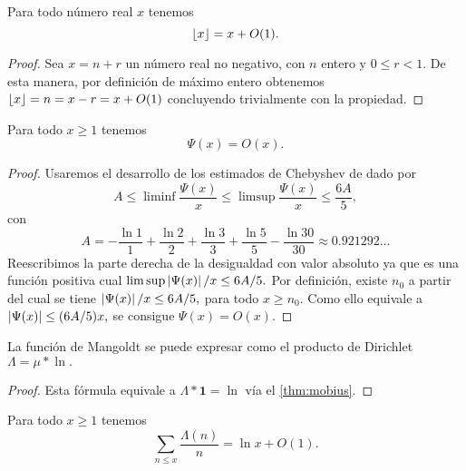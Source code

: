 \begin{lemma}
  \label{lem:floor-is-x-o1}
  Para todo n\'umero real \(x\) tenemos
  \[
    \left\lfloor x \right\rfloor = x + O(1).
  \]
\end{lemma}

\begin{proof}
  Sea \(x = n + r\) un n\'umero real no negativo, con
  \(n\) entero y \(0 \leq r < 1\).
  De esta manera, por definici\'on de m\'aximo entero obtenemos
  \(
    \left\lfloor x \right\rfloor = n = x - r = x + O(1)
  \)
  concluyendo trivialmente con la propiedad.
\end{proof}

\begin{lemma}
  \label{lem:psi-is-ox}
  Para todo \(x \geq 1\) tenemos
  \[
    \Psi(x) = O(x).
  \]
\end{lemma}

\begin{proof}
  Usaremos el desarrollo de los estimados de Chebyshev de \cite[secci\'on 3]{Diamond1982} dado por
  \[
    A \leq \liminf \frac{\Psi(x)}{x} \leq \limsup \frac{\Psi(x)}{x} \leq \frac{6A}{5},
  \]
  con
  \[
    A = -\frac{\ln 1}{1} + \frac{\ln 2}{2} + \frac{\ln 3}{3} + \frac{\ln 5}{5} - \frac{\ln 30}{30}
    \approx 0.921292...
  \]
  Reescribimos la parte derecha de la desigualdad con valor absoluto ya que es una funci\'on positiva cual
  \(
    \limsup \left\lvert \Psi(x) \right\rvert/x \leq 6A/5.
  \)
  Por definici\'on, existe \(n_0\) a partir del cual se tiene
  \(
    \left\lvert \Psi(x) \right\rvert/x \leq 6A/5,
  \)
  para todo \(x \geq n_0\).
  Como ello equivale a
  \(
    \left\lvert \Psi(x) \right\rvert \leq (6A/5) x,
  \)
  se consigue \(\Psi(x) = O(x)\).
\end{proof}

\begin{lemma}
  \label{lem:mangoldt-is-mu-ln}
  La funci\'on de Mangoldt se puede expresar como el producto de Dirichlet
  \(
    \Lambda = \mu * \ln.
  \)
\end{lemma}

\begin{proof}
  Esta f\'ormula equivale a
  \(\Lambda * \textbf{1} = \ln\)
  v\'ia el \cref{thm:mobius}.
\end{proof}

\begin{lemma}
  \label{lem:mangoldt-n-lnx-o1}
  Para todo \(x \geq 1\) tenemos
  \[
    \sum_{n \leq x} \frac{\Lambda(n)}{n} = \ln x + O(1).
  \]
\end{lemma}

